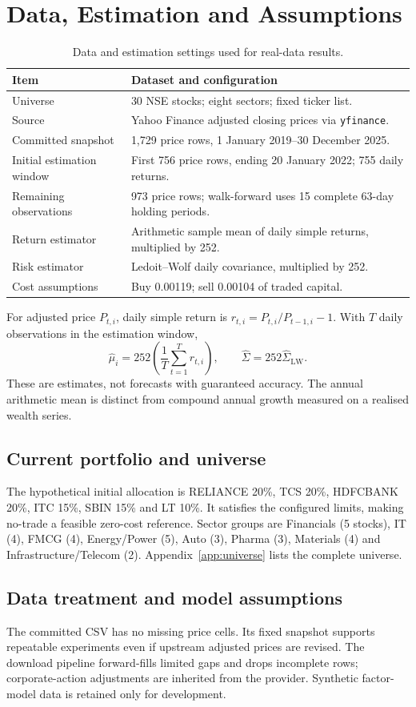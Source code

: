 \documentclass[12pt,a4paper]{article}
\newcommand{\newsec}[1]{\section{#1}}
\begin{document}
\newsec{Data, Estimation and Assumptions}
\begin{table}[H]\centering
\begin{tabularx}{\linewidth}{@{}p{49mm}Y@{}}\toprule
Item & Dataset and configuration\\\midrule
Universe & 30 NSE stocks; eight sectors; fixed ticker list.\\
Source & Yahoo Finance adjusted closing prices via \texttt{yfinance}.\\
Committed snapshot & 1,729 price rows, 1 January 2019--30 December 2025.\\
Initial estimation window & First 756 price rows, ending 20 January 2022; 755 daily returns.\\
Remaining observations & 973 price rows; walk-forward uses 15 complete 63-day holding periods.\\
Return estimator & Arithmetic sample mean of daily simple returns, multiplied by 252.\\
Risk estimator & Ledoit--Wolf daily covariance, multiplied by 252.\\
Cost assumptions & Buy 0.00119; sell 0.00104 of traded capital.\\\bottomrule
\end{tabularx}
\caption{Data and estimation settings used for real-data results.}
\end{table}
For adjusted price $P_{t,i}$, daily simple return is $r_{t,i}=P_{t,i}/P_{t-1,i}-1$. With $T$ daily observations in the estimation window,
\[
\widehat\mu_i=252\left(\frac{1}{T}\sum_{t=1}^{T}r_{t,i}\right),\qquad
\widehat\Sigma=252\widehat\Sigma_{\mathrm{LW}}.
\]
These are estimates, not forecasts with guaranteed accuracy. The annual arithmetic mean is distinct from compound annual growth measured on a realised wealth series.
\subsection{Current portfolio and universe}
The hypothetical initial allocation is RELIANCE 20\%, TCS 20\%, HDFCBANK 20\%, ITC 15\%, SBIN 15\% and LT 10\%. It satisfies the configured limits, making no-trade a feasible zero-cost reference. Sector groups are Financials (5 stocks), IT (4), FMCG (4), Energy/Power (5), Auto (3), Pharma (3), Materials (4) and Infrastructure/Telecom (2). Appendix~\ref{app:universe} lists the complete universe.
\subsection{Data treatment and model assumptions}
The committed CSV has no missing price cells. Its fixed snapshot supports repeatable experiments even if upstream adjusted prices are revised. The download pipeline forward-fills limited gaps and drops incomplete rows; corporate-action adjustments are inherited from the provider. Synthetic factor-model data is retained only for development.
\end{document}
